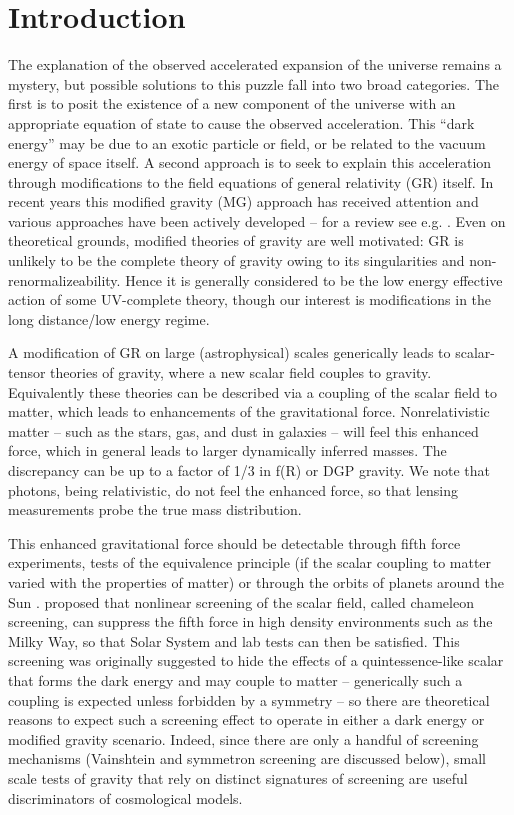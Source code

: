 \documentclass[useAMS,usenatbib,twocolumn]{mn2e}
\begin{document}
\section{Introduction}
The explanation of the observed accelerated expansion of the universe remains a
mystery, but possible solutions to this puzzle fall into two broad
categories. The first is to posit the existence of a new component of the
universe with an appropriate equation of state to cause the observed
acceleration. This ``dark energy'' may be due to an exotic particle or field, or
be related to the vacuum energy of space itself. A second approach is to seek to
explain this acceleration through modifications to the field equations of
general relativity (GR) itself. In recent years this modified gravity (MG)
approach has received attention and various approaches have been actively
developed -- for a review see e.g. \citet{jain-khoury10}. 
Even on theoretical grounds, modified theories of gravity are well
motivated: GR is unlikely to be the complete theory of gravity owing to 
its singularities and non-renormalizeability. Hence it is generally
considered to be the low energy effective action of some UV-complete
theory, though our interest is modifications in the long distance/low energy
regime. 
 
 A modification of GR on large (astrophysical) scales generically leads to
scalar-tensor theories of gravity, where a new scalar field couples to gravity.
Equivalently these theories can be described via a coupling of the scalar field
to matter, which leads to enhancements of the gravitational force.
Nonrelativistic matter -- such as the stars, gas, and dust in galaxies -- will
feel this enhanced force, which in general leads to larger dynamically inferred
masses. The discrepancy can be up to a factor of 1/3 in f(R) or DGP gravity. We
note that photons, being relativistic, do not feel the enhanced force, so that
lensing measurements probe the true mass distribution.
 
This enhanced gravitational force should be detectable through fifth force 
experiments, tests of the equivalence principle (if the scalar coupling to
matter varied with the properties of matter) or through the orbits of planets
around the Sun \citep{will06}. \citet{khoury04} proposed that
nonlinear screening of the scalar field, called chameleon screening, can
suppress the fifth force in high density environments such as the Milky Way, so
that Solar System and lab tests can then be satisfied. This screening was
originally suggested to hide the effects of a quintessence-like scalar that
forms the dark energy and may couple to matter -- generically such a coupling is
expected unless forbidden by a symmetry -- so there are theoretical
reasons to expect such
a screening effect to operate in either a dark energy or modified gravity
scenario. Indeed, since there are only a handful of screening mechanisms
(Vainshtein and symmetron screening are discussed below), small scale tests of
gravity that rely on distinct signatures of screening are useful discriminators
of cosmological models.
\end{document}
